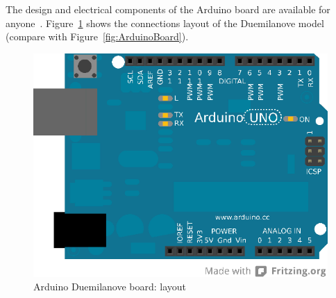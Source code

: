 The design and electrical components of the Arduino board are available for anyone~\cite{Arduino}. Figure~\ref{fig:Arduino_schematics} shows the connections layout of the Duemilanove model (compare with Figure~\ref{fig:ArduinoBoard}).

\begin{figure}[htbp]
  \centering
  \includegraphics[width=0.7\linewidth]{figures/duemilanove_layout_NEW.eps}
  \caption{Arduino Duemilanove board: layout
  \label{fig:Arduino_schematics}}
\end{figure}